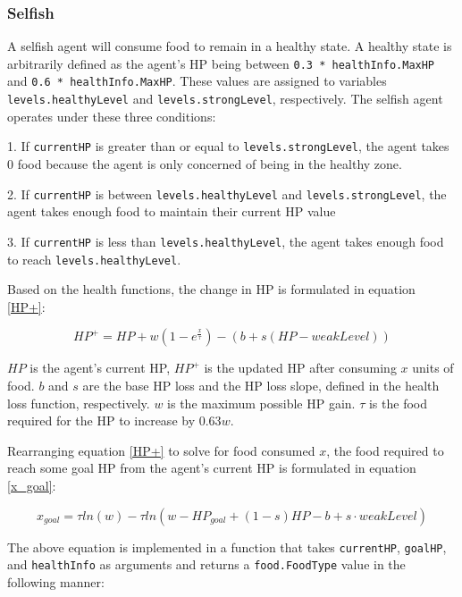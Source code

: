 \subsubsection{Selfish}

A selfish agent will consume food to remain in a healthy state. A healthy state is arbitrarily defined as the agent's HP being between \texttt{0.3 * healthInfo.MaxHP} and \texttt{0.6 * healthInfo.MaxHP}. These values are assigned to variables \texttt{levels.healthyLevel} and \texttt{levels.strongLevel}, respectively. The selfish agent operates under these three conditions:

1. If \texttt{currentHP} is greater than or equal to \texttt{levels.strongLevel}, the agent takes 0 food because the agent is only concerned of being in the healthy zone.

2. If \texttt{currentHP} is between \texttt{levels.healthyLevel} and \texttt{levels.strongLevel}, the agent takes enough food to maintain their current HP value

3. If \texttt{currentHP} is less than \texttt{levels.healthyLevel}, the agent takes enough food to reach \texttt{levels.healthyLevel}.

Based on the health functions, the change in HP is formulated in equation \eqref{HP+}:

\begin{equation}
    HP^+ = HP + w(1 - e^{\frac{x}{\tau}}) - (b + s(HP - weakLevel)) \label{HP+}
\end{equation}

$HP$ is the agent's current HP, $HP^+$ is the updated HP after consuming $x$ units of food. $b$ and $s$ are the base HP loss and the HP loss slope, defined in the health loss function, respectively. $w$ is the maximum possible HP gain. $\tau$ is the food required for the HP to increase by $0.63w$.

Rearranging equation \eqref{HP+} to solve for food consumed $x$, the food required to reach some goal HP from the agent's current HP is formulated in equation \eqref{x_goal}:

\begin{equation}
    x_{goal} = \tau ln(w) - \tau ln(w - HP_{goal} + (1 - s)HP - b + s \cdot weakLevel) \label{x_goal}
\end{equation}

The above equation is implemented in a function that takes \texttt{currentHP}, \texttt{goalHP}, and \texttt{healthInfo} as arguments and returns a \texttt{food.FoodType} value in the following manner:

